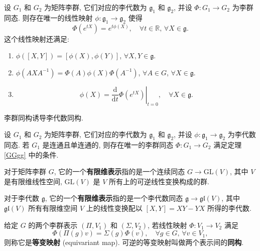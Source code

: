 \begin{theorem}
    \label{GGgg}
    设 $ G_1 $ 和 $ G_2 $ 为矩阵李群, 它们对应的李代数为 $ \mathfrak{g}_1 $ 和 $ \mathfrak{g}_2 $, 并设 $ \Phi:G_1\to G_2 $ 为李群同态. 则存在唯一的线性映射 $ \phi:\mathfrak{g}_1\to\mathfrak{g}_2 $ 使得
    \[ \Phi\left(e^{tX}\right)=e^{t\phi(X)},\quad\forall t\in\mathbb{R},\,\forall X\in\mathfrak{g}. \]
    这个线性映射还满足:
    \begin{enumerate}
        \item $ \phi([X,Y]) = [\phi(X),\phi(Y)] $, $ \forall X,Y\in\mathfrak{g} $.
        \item $ \phi(AXA^{-1})=\Phi(A)\phi(X)\Phi(A^{-1}) $, $ \forall A\in G $, $ \forall X\in\mathfrak{g} $.
        \item \[ \phi(X)=\left.\frac{\mathrm{d}}{\mathrm{d}t}\Phi\left( e^{tX} \right)\right|_{t=0},\quad\forall X\in\mathfrak{g}. \]
    \end{enumerate}
\end{theorem}

\begin{corollary}
    李群同构诱导李代数同构.
\end{corollary}

\begin{theorem}
    \label{ggGG}
    设 $ G_1 $ 和 $ G_2 $ 为矩阵李群, 它们对应的李代数为 $ \mathfrak{g}_1 $ 和 $ \mathfrak{g}_2 $, 并设 $ \phi:\mathfrak{g}_1\to\mathfrak{g}_2 $ 为李代数同态. 若 $ G_1 $ 是连通且单连通的, 则存在唯一的李群同态 $ \Phi:G_1\to G_2 $ 满足定理 \ref{GGgg} 中的条件.
\end{theorem}

\begin{definition}[李群表示]
    对于矩阵李群 $ G $, 它的一个{\bf 有限维表示}指的是一个连续同态 $ G\to\mathrm{GL}(V) $, 其中 $ V $ 是有限维线性空间, $ \mathrm{GL}(V) $ 是 $ V $ 所有上的可逆线性变换构成的群.
\end{definition}
\begin{definition}[李代数表示]
    对于李代数 $ \mathfrak{g} $, 它的一个{\bf 有限维表示}指的是一个李代数同态 $ \mathfrak{g}\to\mathfrak{gl}(V) $, 其中 $ \mathfrak{gl}(V) $ 所有有限维空间 $ V $ 上的线性变换配以 $ [X,Y]=XY-YX $ 所得的李代数.
\end{definition}

\begin{definition}
    给定 $ G $ 的两个李群表示 $ (\Pi,V_1) $ 和 $ (\Sigma,V_2) $, 若线性映射 $ \Phi:V_1\to V_2 $ 满足 
    \[ \Phi(\Pi(g)v)=\Sigma(g)\Phi(v),\quad\forall g\in G,\,\forall v\in V_1, \] 
    则称它是{\bf 等变映射} (equivariant map). 可逆的等变映射叫做两个表示间的{\bf 同构}.
\end{definition}

